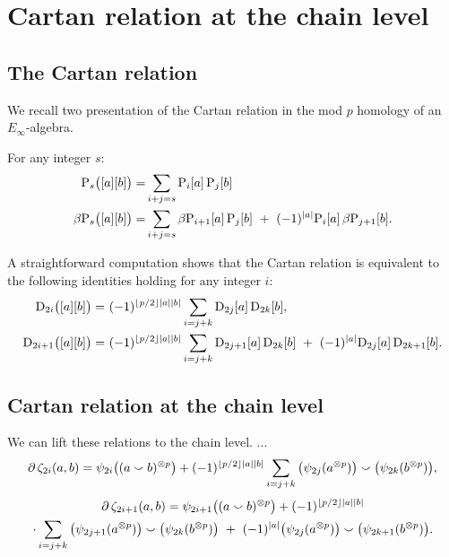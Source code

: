 
\section{Cartan relation at the chain level}\label{s:cartan}

\subsection{The Cartan relation}

We recall two presentation of the Cartan relation in the mod $p$ homology of an $E_\infty$-algebra.

\sssec

For any integer $s$:
\begin{align}
	\mathrm{P}_s\big([a][b]\big) =&
	\sum_{i+j=s} \mathrm{P}_i[a] \, \mathrm{P}_j[b] \\
	\beta\mathrm{P}_s\big([a][b]\big) =&
	\sum_{i+j=s} \beta\mathrm{P}_{i+1}[a] \, \mathrm{P}_j[b] \ +\ (-1)^{\lvert a\rvert} \mathrm{P}_i[a] \, \beta\mathrm{P}_{j+1}[b].
\end{align}

\sssec

A straightforward computation shows that the Cartan relation is equivalent to the following identities holding for any integer $i$:
\begin{align}
	\mathrm{D}_{2i}\big([a][b]\big) =\ &
	(-1)^{\lfloor p/2\rfloor\lvert a\rvert\lvert b\rvert} \sum_{i=j+k} \mathrm{D}_{2j}[a] \, \mathrm{D}_{2k}[b], \\
	\mathrm{D}_{2i+1}\big([a][b]\big) =\ &
	(-1)^{\lfloor p/2\rfloor\lvert a\rvert\lvert b\rvert} \sum_{i=j+k} \mathrm{D}_{2j+1}[a] \, \mathrm{D}_{2k}[b] \ +\ (-1)^{\lvert a\rvert}\mathrm{D}_{2j}[a] \, \mathrm{D}_{2k+1}[b].
\end{align}


\subsection{Cartan relation at the chain level}

We can lift these relations to the chain level.
...
\begin{align*}
	\operatorname{\partial}\zeta_{2i}(a,b) = \psi_{2i}\big((a \smallsmile b)^{\otimes p}\big) +
	(-1)^{\lfloor p/2\rfloor\lvert a\rvert\lvert b\rvert} \sum_{i=j+k}\big(\psi_{2j}(a^{\otimes p})\big) \smallsmile \big(\psi_{2k}(b^{\otimes p})\big),
\end{align*}
\begin{multline*}
	\operatorname{\partial}\zeta_{2i+1}(a,b) =
	\psi_{2i+1}\big((a \smallsmile b)^{\otimes p}\big) + (-1)^{\lfloor p/2\rfloor\lvert a\rvert\lvert b\rvert} \\
	\cdot \sum_{i=j+k} \big(\psi_{2j+1}(a^{\otimes p})\big) \smallsmile \big(\psi_{2k}(b^{\otimes p})\big) \ +\
	(-1)^{\lvert a\rvert}\big(\psi_{2j}(a^{\otimes p})\big) \smallsmile \big(\psi_{2k+1}(b^{\otimes p})\big).
\end{multline*}

